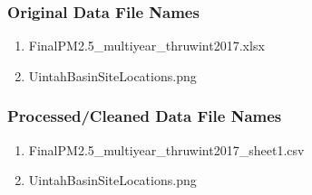 \subsubsection*{Original Data File Names}

\begin{enumerate}
\item FinalPM2.5\_multiyear\_thruwint2017.xlsx
\item UintahBasinSiteLocations.png
\end{enumerate}

\subsubsection*{Processed/Cleaned Data File Names}

\begin{enumerate}
\item FinalPM2.5\_multiyear\_thruwint2017\_sheet1.csv%
\item UintahBasinSiteLocations.png
\end{enumerate}
